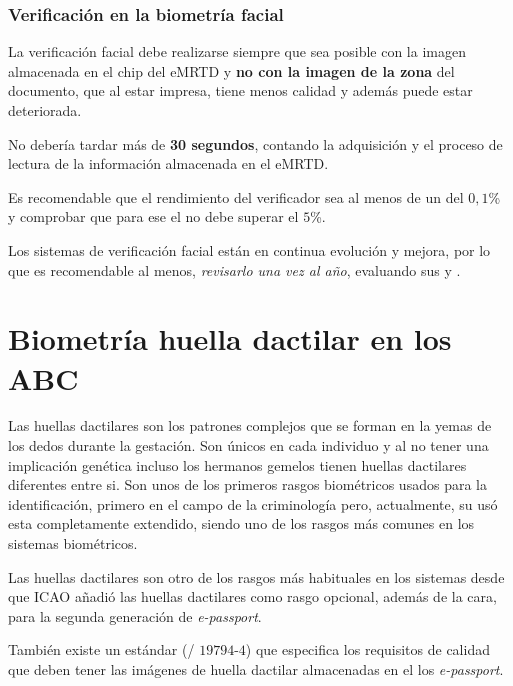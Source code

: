 \subsubsection{Verificación en la biometría facial}\label{subsec:VerificacionFacialABC}

La verificación \gls{facial} debe realizarse siempre que sea posible con la imagen almacenada en el chip del \gls{eMRTD} y \textbf{no con la imagen de la zona } del documento, que al estar impresa, tiene menos calidad y además puede estar deteriorada.   

No debería tardar más de \textbf{30 segundos}, contando la adquisición  y el proceso de lectura de la información almacenada en el \gls{eMRTD}.

Es recomendable que el rendimiento del verificador sea al menos de un \textbf{} del $0,1$\% y comprobar que para ese  el \textbf{} no debe superar el $5$\%.  

Los sistemas de verificación facial están en continua evolución y mejora, por lo que es recomendable al menos, \textit{revisarlo una vez al año}, evaluando sus  y .



\section{Biometría huella dactilar en los ABC}\label{subsec:BiometriaDactilarABC}

Las huellas dactilares son los patrones complejos que se forman en la yemas de los dedos durante la gestación. Son únicos en cada individuo y al no tener una implicación genética incluso los hermanos gemelos tienen huellas dactilares diferentes entre si. Son unos de los primeros rasgos biométricos usados para la identificación, primero en el campo de la criminología pero, actualmente, su usó esta completamente extendido, siendo uno de los rasgos más comunes en los sistemas biométricos.

Las huellas dactilares son otro de los rasgos más habituales en los sistemas  desde que \gls{ICAO} añadió las huellas dactilares como rasgo  opcional, además de la cara, para la segunda generación de \textit{\gls{e-passport}}.

También existe un estándar (/ $19794$-$4$) que especifica los requisitos de calidad que deben tener las imágenes de huella dactilar almacenadas en el los \textit{\gls{e-passport}}. 

